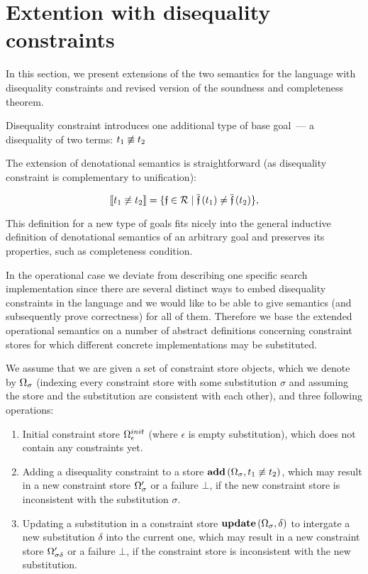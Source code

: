\section{Extention with disequality constraints}

In this section, we present extensions of the two semantics for the language with disequality constraints and revised version of the soundness and completeness theorem.

Disequality constraint introduces one additional type of base goal~--- a disequality of two terms: $t_1 \not\equiv t_2$

The extension of denotational semantics is straightforward (as disequality constraint is complementary to unification):

\[ \llbracket{t_1 \not\equiv t_2}\rrbracket  =  \{\mathfrak{f} \in \mathcal{R} \mid \overline{\mathfrak{f}}\,(t_1) \neq \overline{\mathfrak{f}}\,(t_2)\}, \]

This definition for a new type of goals fits nicely into the general inductive definition of denotational semantics of an arbitrary goal
and preserves its properties, such as completeness condition.

In the operational case we deviate from describing one specific search implementation since there are several distinct ways to embed disequality constraints
in the language and we would like to be able to give semantics (and subsequently prove correctness) for all of them. Therefore we base the extended operational
semantics on a number of abstract definitions concerning constraint stores for which different concrete implementations may be substituted.

We assume that we are given a set of constraint store objects, which we denote by $\Omega_\sigma$ (indexing every constraint store with
some substitution $\sigma$ and assuming the store and the substitution are consistent with each other), and three following operations:

\begin{enumerate}
\item Initial constraint store $\Omega_\epsilon^{init}$ (where $\epsilon$ is empty substitution), which does not contain any constraints yet.
\item Adding a disequality constraint to a store $\mathbf{add}\,(\Omega_\sigma, t_1 \not\equiv t_2)$, which may result in a new constraint store $\Omega^\prime_\sigma$ or a failure $\bot$,
  if the new constraint store is inconsistent with the substitution $\sigma$.
\item Updating a substitution in a constraint store $\mathbf{update}\,(\Omega_\sigma, \delta)$ to intergate a new substitution $\delta$ into the current one,
  which may result in a new constraint store $\Omega^\prime_{\sigma \delta}$ or a failure $\bot$, if the constraint store is inconsistent with the new substitution.
\end{enumerate}

